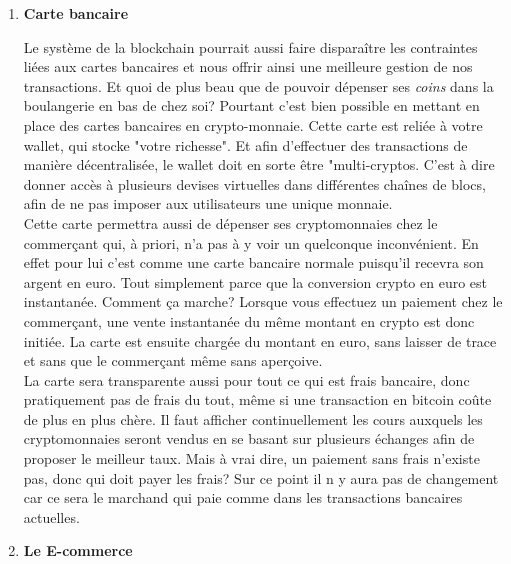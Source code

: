 \documentclass[12pt]{report}
\begin{document}
    \begin{enumerate}
    
        \item \textbf{Carte bancaire}
   

\hspace{1cm} Le système de la blockchain pourrait aussi faire disparaître les contraintes liées aux cartes bancaires et nous offrir ainsi une meilleure gestion de nos transactions. Et quoi de plus beau que de pouvoir dépenser ses \textit{coins} dans la boulangerie en bas de chez soi? Pourtant c'est bien possible en mettant en place des cartes bancaires en crypto-monnaie. Cette carte est reliée à votre wallet, qui stocke "votre richesse". Et afin d'effectuer des transactions de manière décentralisée, le wallet doit en sorte être "multi-cryptos. C'est à dire donner accès à plusieurs devises virtuelles dans différentes chaînes de blocs, afin de ne pas imposer aux utilisateurs une unique monnaie. \\

\hspace{1cm} Cette carte permettra aussi de dépenser ses cryptomonnaies chez le commerçant qui, à priori, n'a pas à y voir un quelconque inconvénient. En effet pour lui c'est comme une carte bancaire normale puisqu'il recevra son argent en euro. Tout simplement parce que la conversion crypto en euro est instantanée. Comment ça marche? Lorsque vous effectuez un paiement chez le commerçant, une vente instantanée du même montant en crypto est donc initiée. La carte est ensuite chargée du montant en euro, sans laisser de trace et sans que le commerçant même sans aperçoive.\\

\hspace{1cm} La carte sera transparente aussi pour tout ce qui est frais bancaire, donc pratiquement pas de frais du tout, même si une transaction en bitcoin coûte de plus en plus chère. Il faut afficher continuellement les cours auxquels les cryptomonnaies seront vendus en se basant sur plusieurs échanges afin de proposer le meilleur taux. Mais à vrai dire, un paiement sans frais n'existe pas, donc qui doit payer les frais? Sur ce point il n y aura pas de changement car ce sera le marchand qui paie comme dans les transactions bancaires actuelles.\\



     \item \textbf{Le E-commerce}


\end{enumerate}
\end{document}
